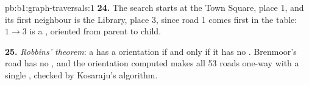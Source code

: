 \begin{solution}{pb:b1:graph-traversals:1}
\textbf{24.} The search starts at the Town Square, place 1, and its first neighbour is the Library, place 3, since
road 1 comes first in the table: $1 \to 3$ is a , oriented from parent to child.

\textbf{25.} \emph{Robbins' theorem}: a  has a  orientation if and only if it has no
. Brenmoor's road  has no , and the orientation computed makes all 53 roads one-way with a single
, checked by Kosaraju's algorithm.
\end{solution}
